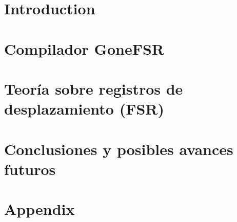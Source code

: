 \documentclass{tfg_domingo}
\begin{document}
\portada        
\frontmatter
\gracias{}
\resumen{}{}
\tableofcontents

\mainmatter
\chapter{Introduction}\label{cap:Intro}
%


\chapter{Compilador GoneFSR}\label{cap:Teoria}




\chapter{Teoría sobre registros de desplazamiento (FSR)}\label{cap:Resultados}




\chapter{Conclusiones y posibles avances futuros}\label{cap:Conclusiones}
%





\appendix
\chapter{Appendix}
%
\end{document}
